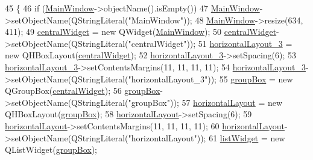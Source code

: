 \begin{DoxyCode}
45     \{
46         \textcolor{keywordflow}{if} (\mbox{\hyperlink{class_main_window}{MainWindow}}->objectName().isEmpty())
47             \mbox{\hyperlink{class_main_window}{MainWindow}}->setObjectName(QStringLiteral(\textcolor{stringliteral}{"MainWindow"}));
48         \mbox{\hyperlink{class_main_window}{MainWindow}}->resize(634, 411);
49         \mbox{\hyperlink{class_ui___main_window_a30075506c2116c3ed4ff25e07ae75f81}{centralWidget}} = \textcolor{keyword}{new} QWidget(\mbox{\hyperlink{class_main_window}{MainWindow}});
50         \mbox{\hyperlink{class_ui___main_window_a30075506c2116c3ed4ff25e07ae75f81}{centralWidget}}->setObjectName(QStringLiteral(\textcolor{stringliteral}{"centralWidget"}));
51         \mbox{\hyperlink{class_ui___main_window_a03ce63974cc69b067c91bbf285cceca8}{horizontalLayout\_3}} = \textcolor{keyword}{new} QHBoxLayout(\mbox{\hyperlink{class_ui___main_window_a30075506c2116c3ed4ff25e07ae75f81}{centralWidget}});
52         \mbox{\hyperlink{class_ui___main_window_a03ce63974cc69b067c91bbf285cceca8}{horizontalLayout\_3}}->setSpacing(6);
53         \mbox{\hyperlink{class_ui___main_window_a03ce63974cc69b067c91bbf285cceca8}{horizontalLayout\_3}}->setContentsMargins(11, 11, 11, 11);
54         \mbox{\hyperlink{class_ui___main_window_a03ce63974cc69b067c91bbf285cceca8}{horizontalLayout\_3}}->setObjectName(QStringLiteral(\textcolor{stringliteral}{"horizontalLayout\_3"}));
55         \mbox{\hyperlink{class_ui___main_window_aef7cb3be8cecfc9aaf98f036a98781ce}{groupBox}} = \textcolor{keyword}{new} QGroupBox(\mbox{\hyperlink{class_ui___main_window_a30075506c2116c3ed4ff25e07ae75f81}{centralWidget}});
56         \mbox{\hyperlink{class_ui___main_window_aef7cb3be8cecfc9aaf98f036a98781ce}{groupBox}}->setObjectName(QStringLiteral(\textcolor{stringliteral}{"groupBox"}));
57         \mbox{\hyperlink{class_ui___main_window_acd6fdc9ebacc4b25b834162380d75ce8}{horizontalLayout}} = \textcolor{keyword}{new} QHBoxLayout(\mbox{\hyperlink{class_ui___main_window_aef7cb3be8cecfc9aaf98f036a98781ce}{groupBox}});
58         \mbox{\hyperlink{class_ui___main_window_acd6fdc9ebacc4b25b834162380d75ce8}{horizontalLayout}}->setSpacing(6);
59         \mbox{\hyperlink{class_ui___main_window_acd6fdc9ebacc4b25b834162380d75ce8}{horizontalLayout}}->setContentsMargins(11, 11, 11, 11);
60         \mbox{\hyperlink{class_ui___main_window_acd6fdc9ebacc4b25b834162380d75ce8}{horizontalLayout}}->setObjectName(QStringLiteral(\textcolor{stringliteral}{"horizontalLayout"}));
61         \mbox{\hyperlink{class_ui___main_window_ae647a15635ba8a0e5d5aec475db99d8f}{listWidget}} = \textcolor{keyword}{new} QListWidget(\mbox{\hyperlink{class_ui___main_window_aef7cb3be8cecfc9aaf98f036a98781ce}{groupBox}});

\end{DoxyCode}
